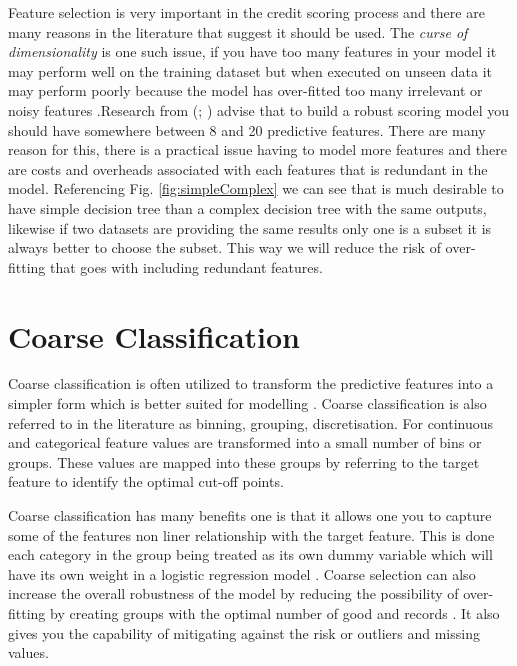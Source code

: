 Feature selection is very important in the credit scoring process and there are many reasons in the literature that suggest it should be used. The \textit{curse of dimensionality} is one such issue, if you have too many features in your model it may perform well on the training dataset but when executed on unseen data it may perform poorly because the model has over-fitted too many irrelevant or noisy features \citep{loughrey_overfitting_2005}.Research from (\cite{thomas_consumer_2009}; \cite{mays_credit_2004})  advise that to build a robust scoring model you should have somewhere between 8 and 20 predictive features. There are many reason for this, there is a practical issue having to model more features and there are costs and overheads associated with each features that is redundant in the model. Referencing Fig. \ref{fig:simpleComplex} we can see that is much desirable to have simple decision tree than a complex decision tree with the same outputs, likewise if two datasets are providing the same results only one is a subset it is always better to choose the subset. This way we will reduce the risk of over-fitting that goes with including redundant features.

\section{Coarse Classification} \label{sec:binning}
Coarse classification is often utilized to transform the predictive features into a simpler form which is better suited for modelling \citep{carroll_transformation_1988}. Coarse classification is also referred to in the literature as binning, grouping, discretisation. For continuous and categorical feature values are transformed into a small number of bins or groups. These values  are mapped into these groups by referring to the target feature to identify the optimal cut-off points. 

Coarse classification has many benefits one is that it allows one you to capture some of the features non liner relationship with the target feature. This is done each category in the group being treated as its own dummy variable which will have its own weight in a logistic regression model \citep{hand_optimal_2005}. Coarse selection can also increase the overall robustness of the model by reducing the possibility of over-fitting by creating groups with the optimal number of good and records \citep{baesens_50_2009}. It also gives you the capability of mitigating against the risk or outliers and missing values. 

